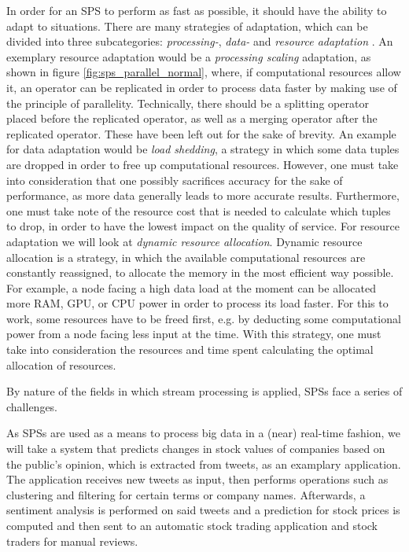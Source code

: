         \quad In order for an SPS to perform as fast as possible, it should have the ability to adapt to situations.
        There are many strategies of adaptation, which can be divided into three subcategories: \textit{processing-}, \textit{data-} and 
        \textit{resource adaptation} \cite[p. 8 f.]{QIN20191}. 
        An exemplary resource adaptation would be a \textit{processing scaling} adaptation, as shown in figure \ref{fig:sps_parallel_normal}, 
        where, if computational resources allow it, an operator can be replicated in order to process data faster by
        making use of the principle of parallelity. Technically, there should be a splitting operator placed before the replicated operator, 
        as well as a merging operator after the replicated operator. These have been left out for the sake of brevity.
        An example for data adaptation would be \textit{load shedding}, a strategy in which some data tuples are dropped in order to free up computational resources.
        However, one must take into consideration that one possibly sacrifices accuracy for the sake of performance, as more data generally leads to more accurate results.
        Furthermore, one must take note of the resource cost that is needed to calculate which tuples to drop, in order to have the lowest impact on the quality of service.
        For resource adaptation we will look at \textit{dynamic resource allocation}. Dynamic resource allocation is a strategy, in which the available computational 
        resources are constantly reassigned, to allocate the memory in the most efficient way possible. For example, a node facing a high data load at the moment can 
        be allocated more RAM, GPU, or CPU power in order to process its load faster. For this to work, some resources have to be freed first, e.g. by deducting some
        computational power from a node facing less input at the time. With this strategy, one must take into consideration the resources and time spent calculating 
        the optimal allocation of resources.

        \quad By nature of the fields in which stream processing is applied, SPSs face a series of challenges.
        
        \quad As SPSs are used as a means to process big data in a (near) real-time fashion, we will take a system that predicts changes in stock values 
        of companies based on the public's opinion, which is extracted from tweets, as an examplary application.
        The application receives new \gls{tweet}s as input, then performs operations such as clustering and filtering for certain terms or company names. 
        Afterwards, a sentiment analysis is performed on said tweets and a prediction for stock prices is computed and then sent 
        to an automatic stock trading application and stock traders for manual reviews.


